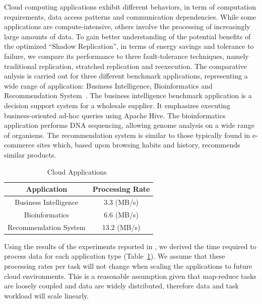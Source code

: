 Cloud computing applications exhibit different behaviors, in term of
computation requirements, data access patterns and communication
dependencies. While some applications are compute-intensive, others
involve the processing of increasingly large amounts of data. 
To gain better understanding of the potential benefits of the optimized ``Shadow Replication'', in terms of energy savings and tolerance to failure, 
we compare its performance to three fault-tolerance techniques, namely traditional replication, stratched replication and reexecution. The comparative
anlysis is carried out for three different benchmark applications, representing a wide range of
application: Business Intelligence, Bioinformatics and
Recommendation System~\cite{mrbs}.
The business intelligence benchmark application
is a decision support system for a wholesale supplier. It emphasizes
executing business-oriented ad-hoc queries using Apache Hive. The
bioinformatics application performs DNA sequencing, allowing genome
analysis on a wide range of organisms. The recommendation system is
similar to those typically found in e-commerce sites which, based upon
browsing habits and history, recommends similar
products.

\begin{table}[h]
	\centering
		\begin{tabular}{|c|c|}
			\hline
			Application               & Processing Rate \\
			\hline
			Business Intelligence     & 3.3 (MB/s)      \\ 
			Bioinformatics            & 6.6 (MB/s)      \\ 
			Recommendation System     & 13.2 (MB/s)     \\
			\hline
                \end{tabular}
	\caption{Cloud Applications~\cite{mrbs}}
	\label{tbl:application_processing_rates}
\end{table}

Using the results of the experiments reported in \cite{mrbs}, we
derived the time required to process data for each application type (Table~\ref{tbl:application_processing_rates}). We assume that
these processing rates per task will not change when scaling the
applications to future cloud environments. This is a reasonable
assumption given that map-reduce tasks are loosely coupled and data
are widely distributed, therefore data and task workload will scale
linearly.

